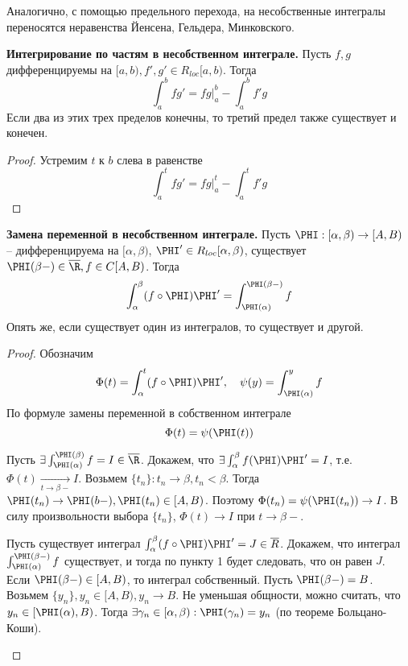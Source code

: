 \begin{MyList}
	\begin{Rem}
		Аналогично, с помощью предельного перехода, на несобственные интегралы переносятся неравенства Йенсена, Гельдера, Минковского.
	\end{Rem}

	\item \textbf{Интегрирование по частям в несобственном интеграле.} Пусть $f, g$ дифференцируемы на $[a, b), f', g' \in R_{loc}[a, b)$.
	Тогда
	\[\int_a^b fg' = \left.fg\right|_a^b - \int_a^b f'g\]
	Если два из этих трех пределов конечны, то третий предел также существует и конечен.

	\begin{proof}
		Устремим $t$ к $b$ слева в равенстве
		\[\int_a^t fg' = \left.fg\right|_a^t - \int_a^t f'g\]
	\end{proof}

	\item \textbf{Замена переменной в несобственном интеграле.} 
	Пусть $\PHI : [\alpha, \beta) \to [A, B)$ -- дифференцируема на $[\alpha, \beta)$, $\PHI' \in R_{loc}[\alpha, \beta)$, существует 
	$\PHI(\beta -) \in \overline{\R}, f \in C[A, B)$. Тогда
	\[\int_\alpha^\beta (f \circ \PHI)\PHI' = \int_{\PHI(\alpha)}^{\PHI(\beta-)} f\]
	Опять же, если существует один из интегралов, то существует и другой.    

	\begin{proof}
		Обозначим
		\[\Phi(t) = \int_\alpha^t (f \circ \PHI) \PHI', \quad \psi(y) = \int_{\PHI(\alpha)}^y f\]
		По формуле замены переменной в собственном интеграле 
		\[\Phi(t) = \psi(\PHI(t))\]

		\begin{MyList}
			\item Пусть $\exists \int_{\PHI(\alpha)}^{\PHI(\beta)} f = I \in \overline{\R}$. Докажем, что $\exists \int_\alpha^\beta f(\PHI)\PHI' = I$, т.е.
			$\Phi(t) \xrightarrow[t \to \beta-]{} I$. Возьмем $\{t_n\} : t_n \to \beta, t_n < \beta$. 
			Тогда $\PHI(t_n) \to \PHI(b-), \PHI(t_n) \in [A, B)$. Поэтому $\Phi(t_n) = \psi(\PHI(t_n)) \to I$. В силу произвольности выбора $\{t_n\}$, $\Phi(t) \to I$ при $t \to \beta-$.
			
			\item Пусть существует интеграл $\int_\alpha^\beta (f \circ \PHI) \PHI' = J \in \overline{R}$. 
			Докажем, что интеграл $\int_{\PHI(\alpha)}^{\PHI(\beta-)} f$ существует, и тогда по пункту 1 будет следовать, что он равен $J$. 
			Если $\PHI(\beta -) \in [A, B)$, то интеграл собственный. 
			Пусть $\PHI(\beta-) = B$. Возьмем $\{y_n\}, y_n \in [A, B), y_n \to B$. Не уменьшая общности, можно считать, что $y_n \in [\PHI(\alpha), B)$.
			Тогда $\exists \gamma_n \in [\alpha, \beta) : \PHI(\gamma_n) = y_n$ (по теореме Больцано-Коши).


\end{MyList}
\end{proof}
\end{MyList}
